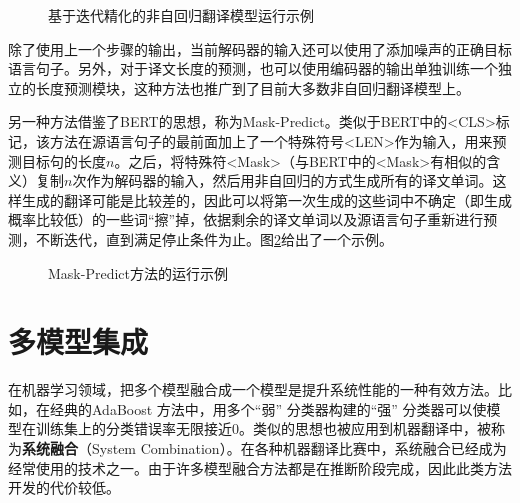 \begin{figure}[htp]
\centering

\caption{基于迭代精化的非自回归翻译模型运行示例}
\label{fig:14-18}
\end{figure}

\parinterval 除了使用上一个步骤的输出，当前解码器的输入还可以使用了添加噪声的正确目标语言句子。另外，对于译文长度的预测，也可以使用编码器的输出单独训练一个独立的长度预测模块，这种方法也推广到了目前大多数非自回归翻译模型上。

\parinterval 另一种方法借鉴了BERT的思想，称为Mask-Predict。类似于BERT中的<CLS>标记，该方法在源语言句子的最前面加上了一个特殊符号<LEN>作为输入，用来预测目标句的长度$n$。之后，将特殊符<Mask>（与BERT中的<Mask>有相似的含义）复制$n$次作为解码器的输入，然后用非自回归的方式生成所有的译文单词。这样生成的翻译可能是比较差的，因此可以将第一次生成的这些词中不确定（即生成概率比较低）的一些词“擦”掉，依据剩余的译文单词以及源语言句子重新进行预测，不断迭代，直到满足停止条件为止。图\ref{fig:14-19}给出了一个示例。

\begin{figure}[htp]
\centering

\caption{Mask-Predict方法的运行示例}
\label{fig:14-19}
\end{figure}

\sectionnewpage
\section{多模型集成}\label{sec:14-5}

\parinterval 在机器学习领域，把多个模型融合成一个模型是提升系统性能的一种有效方法。比如，在经典的AdaBoost 方法中，用多个“弱” 分类器构建的“强” 分类器可以使模型在训练集上的分类错误率无限接近0。类似的思想也被应用到机器翻译中，被称为{\small\sffamily\bfseries{系统融合}}（System Combination）。在各种机器翻译比赛中，系统融合已经成为经常使用的技术之一。由于许多模型融合方法都是在推断阶段完成，因此此类方法开发的代价较低。

